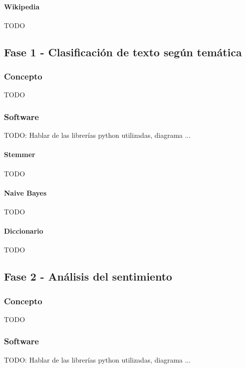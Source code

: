 \documentclass[../all.tex]{subfiles}
\begin{document}
        \paragraph{Wikipedia}
            {\color{red} 
                TODO
            }

\newpage    
\subsection{Fase 1 - Clasificación de texto según temática}
    \subsubsection{Concepto}
        {\color{red} 
            TODO
        }
    \subsubsection{Software}
        {\color{red} 
        TODO: Hablar de las librerías python utilizadas, diagrama ...
        }
        \paragraph{Stemmer}
            {\color{red} 
                TODO
            }
        \paragraph{Naive Bayes}
            {\color{red} 
                TODO
            }
        \paragraph{Diccionario}
            {\color{red} 
                TODO
            }

\newpage
\subsection{Fase 2 - Análisis del sentimiento}
    \subsubsection{Concepto}
            {\color{red} 
                TODO
            }
    \subsubsection{Software}
        {\color{red} 
        TODO: Hablar de las librerías python utilizadas, diagrama ...
        }
\end{document}
